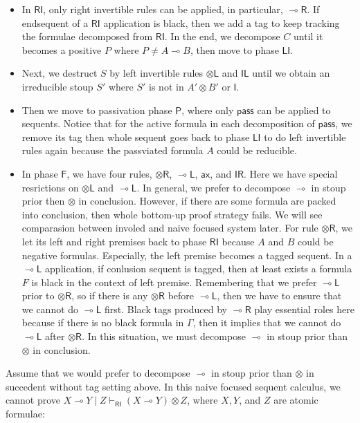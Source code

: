 \documentclass[submission,copyright,creativecommons]{eptcs}
\newcommand{\tl}{\otimes \mathsf{L}}
\newcommand{\tr}{\otimes \mathsf{R}}
\newcommand{\lright}{\multimap \mathsf{R}}
\newcommand{\lleft}{\multimap \mathsf{L}}
\newcommand{\pass}{\mathsf{pass}}
\newcommand{\unitl}{\mathsf{IL}}
\newcommand{\unitr}{\mathsf{IR}}
\newcommand{\ax}{\mathsf{ax}}
\newcommand{\ot}{\otimes}
\newcommand{\lolli}{\multimap}
\newcommand{\I}{\mathsf{I}}
\newcommand{\RI}{\mathsf{RI}}
\newcommand{\LI}{\mathsf{LI}}
\newcommand{\Pass}{\mathsf{P}}
\newcommand{\F}{\mathsf{F}}
\begin{document}
\begin{itemize}
  \item In $\RI$, only right invertible rules can be applied, in particular, $\lright$.
  If endsequent of a $\RI$ application is black, then we add a tag to keep tracking the formulae decomposed from $\RI$.
  In the end, we decompose $C$ until it becomes a positive $P$ where $P \neq A \lolli B$, then move to phase $\LI$.
  \item Next, we destruct $S$ by left invertible rules $\tl$ and $\unitl$ until we obtain an irreducible stoup $S'$ where $S'$ is not in $A' \ot B'$ or $\I$.
  \item Then we move to passivation phase $\Pass$, where only $\pass$ can be applied to sequents.
  Notice that for the active formula in each decomposition of $\pass$, we remove its tag then whole sequent goes back to phase $\LI$ to do left invertible rules again because the passviated formula $A$ could be reducible.
  \item In phase $\F$, we have four rules, $\tr$, $\lleft$, $\ax$, and $\unitr$.
  Here we have special resrictions on $\tl$ and $\lleft$.
  In general, we prefer to decompose $\lolli$ in stoup prior then $\ot$ in conclusion.
  However, if there are some formula are packed into conclusion, then whole bottom-up proof strategy fails.
  We will see comparasion between involed and naive focused system later.
  For rule $\tr$, we let its left and right premises back to phase $\RI$ because $A$ and $B$ could be negative formulas.
  Especially, the left premise becomes a tagged sequent.
  In a $\lleft$ application, if conlusion sequent is tagged, then at least exists a formula $F$ is black in the context of left premise.
  Remembering that we prefer $\lleft$ prior to $\tr$, so if there is any $\tr$ before $\lleft$, then we have to ensure that we cannot do $\lleft$ first.
  Black tags produced by $\lright$ play essential roles here because if there is no black formula in $\Gamma$, then it implies that we cannot do $\lleft$ after $\tr$.
  In this situation, we must decompose $\lolli$ in stoup prior than $\ot$ in conclusion.
\end{itemize}

Assume that we would prefer to decompose $\lolli$ in stoup prior than $\ot$ in succedent without tag setting above.
In this naive focused sequent calculus, we cannot prove $X \lolli Y \mid Z \vdash_{\RI} (X \lolli Y) \ot Z$, where $X, Y$, and $Z$ are atomic formulae:
\end{document}
